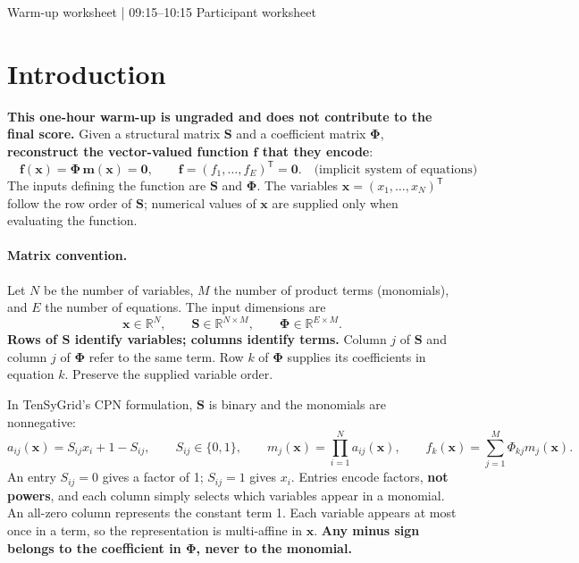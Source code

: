 \documentclass[10pt,a4paper]{article}
\begin{document}
  {Warm-up worksheet | 09:15--10:15}
  {Participant worksheet}

\section{Introduction}\label{sec:warmup}
\textbf{This one-hour warm-up is ungraded and does not contribute to the final score.}
Given a structural matrix $\mathbf{S}$ and a coefficient matrix $\boldsymbol{\Phi}$,
\textbf{reconstruct the vector-valued function $\mathbf f$ that they encode}:
\[
 \boxed{\quad \mathbf f(\mathbf x)=\boldsymbol{\Phi}\,\mathbf m(\mathbf x)=\mathbf{0},\qquad
 \mathbf f=(f_1,\ldots,f_E)^\mathsf T=\mathbf{0}.\quad\textrm{(implicit system of equations)}\quad}
\]
The inputs defining the function are $\mathbf{S}$ and $\boldsymbol{\Phi}$. The variables
$\mathbf x=(x_1,\ldots,x_N)^\mathsf T$ follow the row order of $\mathbf{S}$;
numerical values of $\mathbf x$ are supplied only when evaluating the function.

\paragraph{Matrix convention.}
Let $N$ be the number of variables, $M$ the number of product terms (monomials), and $E$ the
number of equations. The input dimensions are
\[
 \mathbf x\in\mathbb R^N,\qquad \mathbf{S}\in\mathbb R^{N\times M},\qquad
 \boldsymbol{\Phi}\in\mathbb R^{E\times M}.
\]
\textbf{Rows of $\mathbf{S}$ identify variables; columns identify terms.} Column $j$ of
$\mathbf{S}$ and column $j$ of $\boldsymbol{\Phi}$ refer to the same term. Row $k$ of $\boldsymbol{\Phi}$ supplies
its coefficients in equation $k$. Preserve the supplied variable order.

In TenSyGrid's CPN formulation, $\mathbf{S}$ is binary and the monomials are nonnegative:
\[
 a_{ij}(\mathbf x)=S_{ij}x_i+1-S_{ij},\qquad S_{ij}\in\{0,1\},
 \qquad m_j(\mathbf x)=\prod_{i=1}^{N}a_{ij}(\mathbf x),\qquad
 f_k(\mathbf x)=\sum_{j=1}^{M}\Phi_{kj}m_j(\mathbf x).
\]
An entry $S_{ij}=0$ gives a factor of 1; $S_{ij}=1$ gives $x_i$.
Entries encode factors, \textbf{not powers}, and each column simply selects
which variables appear in a monomial. An all-zero column represents the
constant term 1. Each variable appears at most once in a term, so the
representation is multi-affine in $\mathbf x$. \textbf{Any minus sign belongs to
the coefficient in $\boldsymbol{\Phi}$, never to the monomial.}
\end{document}

